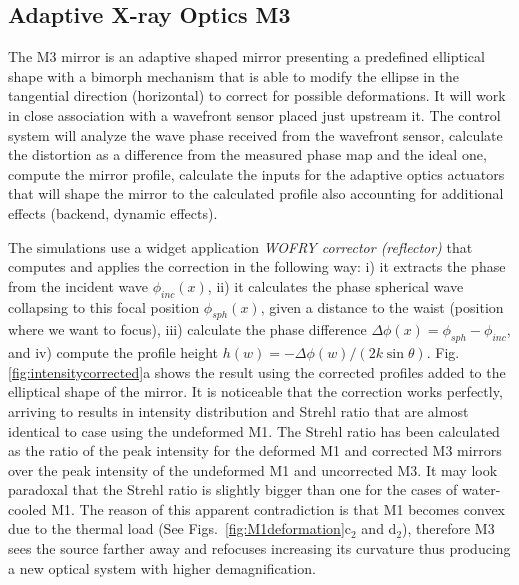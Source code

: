 \documentclass[]{spie}  %
\begin{document}
\subsection{Adaptive X-ray Optics M3}

The M3 mirror is an adaptive shaped mirror presenting a predefined elliptical shape with a bimorph mechanism that is able to modify the ellipse in the tangential direction (horizontal) to correct for possible deformations. It will work in close association with a wavefront sensor placed just upstream it. The control system will analyze the wave phase received from the wavefront sensor, calculate the distortion as a difference from the measured phase map and the ideal one, compute the mirror profile, calculate the inputs for the adaptive optics actuators that will shape the mirror to the calculated profile also accounting for additional effects (backend, dynamic effects).

The simulations use a widget application {\it WOFRY corrector (reflector)} that computes and applies the correction in the following way: i) it extracts the phase from the incident wave $\phi_{inc}(x)$, ii)  it calculates the phase spherical wave collapsing to this focal position $\phi_{sph}(x)$, given a distance to the waist (position where we want to focus), iii) calculate the phase difference $\Delta \phi(x) = \phi_{sph} - \phi_{inc}$, and iv) compute the profile height $h(w) = -\Delta \phi(w) / (2 k \sin \theta)$. Fig.\ref{fig:intensitycorrected}a shows the result using the corrected profiles added to the elliptical shape of the mirror. It is noticeable that the correction works perfectly, arriving to results in intensity distribution and Strehl ratio that are almost identical to case using the undeformed M1. The Strehl ratio has been calculated as the ratio of the peak intensity for the deformed M1 and corrected M3 mirrors over the peak intensity of the undeformed M1 and uncorrected M3. It may look paradoxal that the Strehl ratio is slightly bigger than one for the cases of water-cooled M1. The reason of this apparent contradiction is that M1 becomes convex due to the thermal load (See Figs.~\ref{fig:M1deformation}c$_2$ and d$_2$), therefore M3 sees the source farther away and refocuses increasing its curvature thus producing a new optical system with higher demagnification.   
\end{document}
